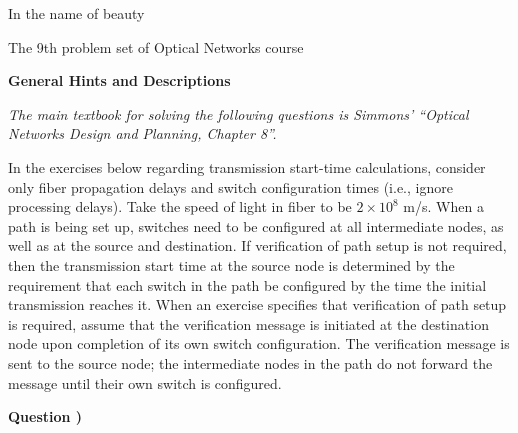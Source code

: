 \documentclass[a4paper]{article}
\newcounter{QuestionNumber}
\newcommand{\Q}{
\textbf{Question \theQuestionNumber)}
\stepcounter{QuestionNumber}
}
\begin{document}
\Large
\begin{center}
In the name of beauty

The 9th problem set of Optical Networks course

\hrulefill
\end{center}

\textbf{General Hints and Descriptions}

\textit{The main textbook for solving the following questions is Simmons' ``Optical Networks Design and Planning, Chapter 8''.}

In the exercises below regarding transmission start-time calculations, consider only
fiber propagation delays and switch configuration times (i.e., ignore processing
delays). Take the speed of light in fiber to be $2 \times 10^8$ m/s. When a path is being set
up, switches need to be configured at all intermediate nodes, as well as at the source
and destination. If verification of path setup is not required, then the transmission
start time at the source node is determined by the requirement that each switch in
the path be configured by the time the initial transmission reaches it.
When an exercise specifies that verification of path setup is required, assume that
the verification message is initiated at the destination node upon completion of its
own switch configuration. The verification message is sent to the source node; the
intermediate nodes in the path do not forward the message until their own switch
is configured.

\Q
\end{document}
